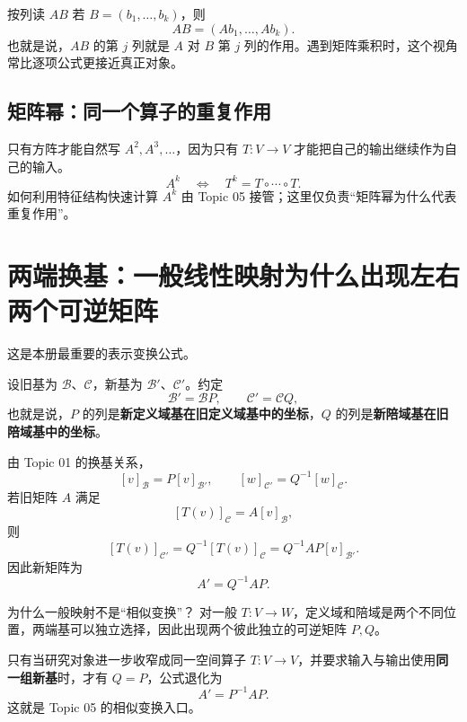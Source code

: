 \documentclass[11pt,a4paper]{ctexart}
\newcommand{\kw}[1]{\textbf{\color{deep}#1}}
\begin{document}
\begin{methodbox}{按列读 $AB$}
若 $B=(b_1,\dots,b_k)$，则
\[
AB=(Ab_1,\dots,Ab_k).
\]
也就是说，$AB$ 的第 $j$ 列就是 $A$ 对 $B$ 第 $j$ 列的作用。遇到矩阵乘积时，这个视角常比逐项公式更接近真正对象。
\end{methodbox}

\subsection{矩阵幂：同一个算子的重复作用}

只有方阵才能自然写 $A^2,A^3,\dots$，因为只有 $T:V\to V$ 才能把自己的输出继续作为自己的输入。
\[
A^k\quad\Longleftrightarrow\quad T^k=T\circ\cdots\circ T.
\]
如何利用特征结构快速计算 $A^k$ 由 Topic 05 接管；这里仅负责“矩阵幂为什么代表重复作用”。

\section{两端换基：一般线性映射为什么出现左右两个可逆矩阵}

这是本册最重要的表示变换公式。

设旧基为 $\mathcal B$、$\mathcal C$，新基为 $\mathcal B'$、$\mathcal C'$。约定
\[
\mathcal B'=\mathcal BP,
\qquad
\mathcal C'=\mathcal CQ,
\]
也就是说，$P$ 的列是\kw{新定义域基在旧定义域基中的坐标}，$Q$ 的列是\kw{新陪域基在旧陪域基中的坐标}。

由 Topic 01 的换基关系，
\[
[v]_{\mathcal B}=P[v]_{\mathcal B'},
\qquad
[w]_{\mathcal C'}=Q^{-1}[w]_{\mathcal C}.
\]
若旧矩阵 $A$ 满足
\[
[T(v)]_{\mathcal C}=A[v]_{\mathcal B},
\]
则
\[
[T(v)]_{\mathcal C'}
=Q^{-1}[T(v)]_{\mathcal C}
=Q^{-1}AP[v]_{\mathcal B'}.
\]
因此新矩阵为
\[
\boxed{A'=Q^{-1}AP.}
\]

\begin{corebox}{为什么一般映射不是“相似变换”？}
对一般 $T:V\to W$，定义域和陪域是两个不同位置，两端基可以独立选择，因此出现两个彼此独立的可逆矩阵 $P,Q$。

只有当研究对象进一步收窄成同一空间算子 $T:V\to V$，并要求输入与输出使用\kw{同一组新基}时，才有 $Q=P$，公式退化为
\[
A'=P^{-1}AP.
\]
这就是 Topic 05 的相似变换入口。
\end{corebox}
\end{document}
